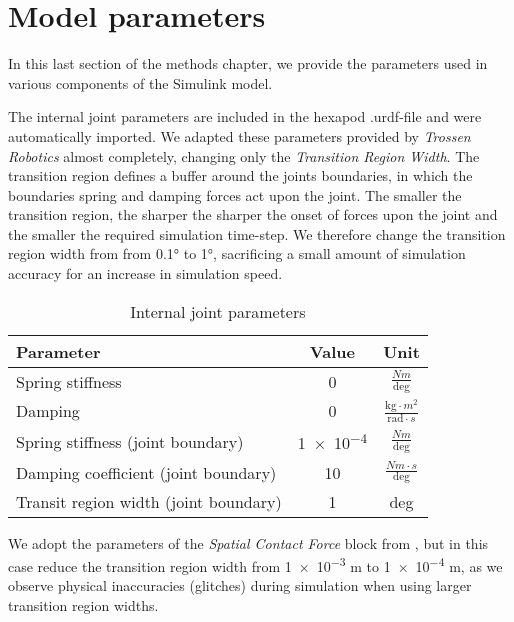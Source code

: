\section{Model parameters}
In this last section of the methods chapter, we provide the parameters used in various components of the Simulink model.

The internal joint parameters are included in the hexapod .urdf-file and were automatically imported.
We adapted these parameters provided by \textit{Trossen Robotics} \parencite{interboticsGithub} almost completely, changing only the \textit{Transition Region Width}.
The transition region defines a buffer around the joints boundaries, in which the boundaries spring and damping forces act upon the joint.
The smaller the transition region, the sharper the sharper the onset of forces upon the joint and the smaller the required simulation time-step.
We  therefore change the transition region width from  from 0.1° to 1°, sacrificing a small amount of simulation accuracy for an increase in simulation speed.

{\def\arraystretch{1.4}\tabcolsep=5pt
	\begin{table}[!h]
		\centering
		\begin{tabular}{| l | c | c |}
			\hline
			\textbf{Parameter} & \textbf{Value} & \textbf{Unit}\\
			\hline
			\hline
			Spring stiffness & 0 & $\frac{Nm}{\text{deg}}$\\
			
			Damping & 0 &  $\frac{\text{kg} \cdot m^2}{\text{rad} \cdot s}$\\
			
			Spring stiffness (joint boundary) & \num{1e-4} & $\frac{Nm}{\text{deg}}$ \\
			
			Damping coefficient (joint boundary) &  10 & $\frac{Nm \cdot s}{\text{deg}}$\\
			
			Transit region width (joint boundary) & 1 &  deg\\
			\hline
		\end{tabular}
		
		\caption{Internal joint parameters}
		\label{table: Joint parameters}
	\end{table}
}

We adopt the parameters of the \textit{Spatial Contact Force} block from \cite{trotta2022walking}, but in this case reduce the transition region width from \num{1e-3} m to \num{1e-4} m, as we observe physical inaccuracies (glitches) during simulation when using larger transition region widths.

